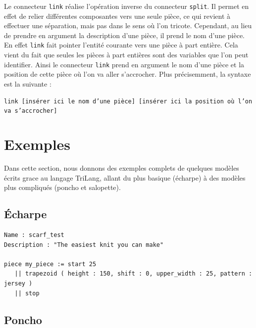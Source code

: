 \documentclass[a4paper,10pt]{article}
\begin{document}
Le connecteur \texttt{link} réalise l'opération inverse du connecteur \texttt{split}. Il permet en effet de relier différentes composantes vers une seule pièce, ce qui revient à effectuer une séparation, mais pas dans le sens où l'on tricote. Cependant, au lieu de prendre en argument la description d'une pièce, il prend le nom d'une pièce. En effet \texttt{link} fait pointer l'entité courante vers une pièce à part entière. Cela vient du fait que seules les pièces à part entières sont des variables que l'on peut identifier. Ainsi le connecteur \texttt{link} prend en argument le nom d'une pièce et la position de cette pièce où l'on va aller s'accrocher. Plus précisemment, la syntaxe est la suivante :

\noindent \texttt{link [insérer ici le nom d'une pièce] [insérer ici la position où l'on va s'accrocher]}


\appendix

\section{Exemples}

Dans cette section, nous donnons des exemples complets de quelques modèles écrits grace au langage TriLang, allant du plus basique (écharpe) à des modèles plus compliqués (poncho et salopette). %

\subsection{Écharpe}

\begin{lstlisting}
Name : scarf_test
Description : "The easiest knit you can make"

piece my_piece := start 25
   || trapezoid ( height : 150, shift : 0, upper_width : 25, pattern : jersey )
   || stop
\end{lstlisting}

\subsection{Poncho}
\end{document}
